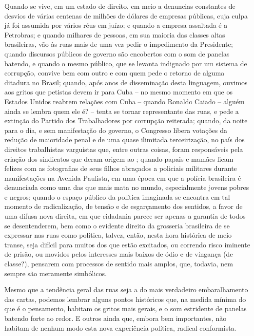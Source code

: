 Quando se vive, em um estado de direito, em meio a denuncias constantes
de desvios de várias centenas de milhões de dólares de empresas
públicas, cuja culpa já foi assumida por vários réus em juízo; e quando
a empresa assaltada é a Petrobras; e quando milhares de pessoas, em sua
maioria das classes altas brasileiras, vão às ruas mais de uma vez pedir
o impedimento da Presidente; quando discursos públicos de governo são
encobertos com o som de panelas batendo, e quando o mesmo público, que
se levanta indignado por um sistema de corrupção, convive bem com outro
e com quem pede o retorno de alguma ditadura no Brasil; quando, após
anos de disseminação desta linguagem, ouvimos aos gritos que petistas
devem ir para Cuba -- no mesmo momento em que os Estados Unidos reabrem
relações com Cuba -- quando Ronaldo Caiado -- alguém ainda se lembra
quem ele é? -- tenta se tornar representante das ruas, e pede a extinção
do Partido dos Trabalhadores por corrupção reiterada; quando, da noite
para o dia, e sem manifestação do governo, o Congresso libera votações
da redução de maioridade penal e de uma quase ilimitada terceirização,
no país dos direitos trabalhistas varguistas que, entre outras coisas,
foram responsáveis pela criação dos sindicatos que deram origem ao ;
quando papais e mamães ficam felizes com as fotografias de seus filhos
abraçados a policiais militares durante manifestações na Avenida
Paulista, em uma época em que a polícia brasileira é denunciada como uma
das que mais mata no mundo, especialmente jovens pobres e negros; quando
o espaço público da política imaginada se encontra em tal momento de
radicalização, de tensão e de esgarçamento dos sentidos, a favor de uma
difusa nova direita, em que cidadania parece ser apenas a garantia de
todos se desentenderem, bem como o evidente direito da grosseria
brasileira de se expressar nas ruas como política, talvez, então, nesta
hora histórica de meio transe, seja difícil para muitos dos que estão
excitados, ou correndo risco iminente de prisão, ou movidos pelos
interesses mais baixos de ódio e de vingança (de classe?), pensarem com
processos de sentido mais amplos, que, todavia, nem sempre são meramente
simbólicos.

Mesmo que a tendência geral das ruas seja a do mais verdadeiro
embaralhamento das cartas, podemos lembrar alguns pontos históricos que,
na medida mínima do que é o pensamento, habitam os gritos mais gerais, e
o som estridente de panelas batendo forte ao redor. E outros ainda que,
embora bem importantes, não habitam de nenhum modo esta nova experiência
política, radical conformista.

